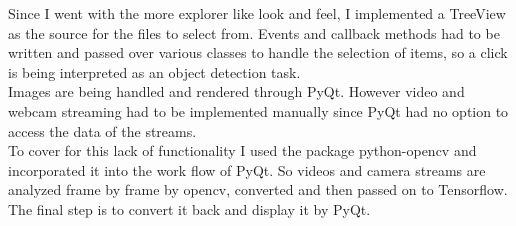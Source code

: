 \begin{itemize}
        Since I went with the more explorer like look and feel, I implemented a TreeView as the source for the files to select from.
        Events and callback methods had to be written and passed over various classes to handle the selection of items, so a click is being
        interpreted as an object detection task. \\
        Images are being handled and rendered through PyQt. However video and webcam streaming had to be implemented manually since PyQt had
        no option to access the data of the streams.\\
        To cover for this lack of functionality I used the package python-opencv and incorporated it into the work flow of PyQt. So videos
        and camera streams are analyzed frame by frame by opencv, converted and then passed on to Tensorflow. The final step is to convert
        it back and display it by PyQt.
\end{itemize} 


